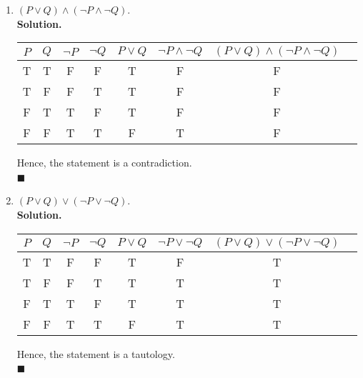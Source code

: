 \documentclass{report}
\newcommand{\sol}{\vspace{1em}\\\textbf{Solution.}\vspace{0.5em}}
\newcommand{\qed}{‎\\‎\hfill$\blacksquare$\vspace{1em}}
\begin{document}
\begin{enumerate}[leftmargin=*]
\begin{enumerate}
              \item $(P \vee Q) \wedge(\neg P \wedge \neg Q)$.
                    \sol{}
                    \begin{center}
                        \begin{tabular}{cccccccc}
                            $P$ & $Q$ & $\neg P$ & $\neg Q$ & $P \vee Q$ & $\neg P \wedge \neg Q$ & $(P \vee Q) \wedge(\neg P \wedge \neg Q)$ \\
                            \hline
                            T   & T   & F        & F        & T          & F                      & F                                         \\
                            T   & F   & F        & T        & T          & F                      & F                                         \\
                            F   & T   & T        & F        & T          & F                      & F                                         \\
                            F   & F   & T        & T        & F          & T                      & F
                        \end{tabular}
                    \end{center}
                    Hence, the statement is a contradiction.\qed

              \item $(P \vee Q) \vee(\neg P \vee \neg Q)$.
                    \sol{}
                    \begin{center}
                        \begin{tabular}{cccccccc}
                            $P$ & $Q$ & $\neg P$ & $\neg Q$ & $P \vee Q$ & $\neg P \vee \neg Q$ & $(P \vee Q) \vee(\neg P \vee \neg Q)$ \\
                            \hline
                            T   & T   & F        & F        & T          & F                    & T                                     \\
                            T   & F   & F        & T        & T          & T                    & T                                     \\
                            F   & T   & T        & F        & T          & T                    & T                                     \\
                            F   & F   & T        & T        & F          & T                    & T
                        \end{tabular}
                    \end{center}
                    Hence, the statement is a tautology.\qed


\end{enumerate}
\end{enumerate}
\end{document}
